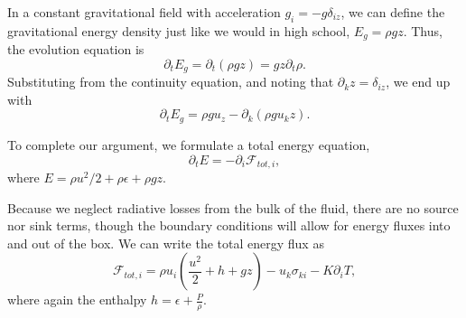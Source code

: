 \documentclass[letterpaper,12pt]{paper}
\begin{document}
In a constant gravitational field with acceleration
$g_i = -g \delta_{iz}$, we can define the gravitational energy density
just like we would in high school, $E_g = \rho g z$. Thus, the
evolution equation is 
\begin{equation}
  \label{eq:grav_en}
  \partial_t E_g = \partial_t (\rho g z) = g z \partial_t \rho.
\end{equation}
Substituting from the continuity equation, and noting that $\partial_k
z = \delta_{iz}$, we end up with
\begin{equation}
  \label{eq:grav_en_final}
  \partial_t E_g = \rho g u_z - \partial_k (\rho g u_k z).
\end{equation}

To complete our argument, we formulate a total energy equation,
\begin{equation}
  \label{eq:total_energy}
  \partial_t E = - \partial_i \mathcal{F}_{tot,i},
\end{equation}
where $E = \rho u^2/2 + \rho \epsilon + \rho g z$.

Because we neglect radiative losses from the bulk of the fluid, there
are no source nor sink terms, though the boundary conditions will
allow for energy fluxes into and out of the box. We can write the
total energy flux as 
\begin{equation}
  \label{eq:total_flux}
  \mathcal{F}_{tot,i} = \rho u_i \left( \frac{u^2}{2} + h + gz\right) - u_k \sigma_{ki} - K \partial_i T,
\end{equation}
where again the enthalpy $h = \epsilon + \frac{P}{\rho}$. 
\end{document}
